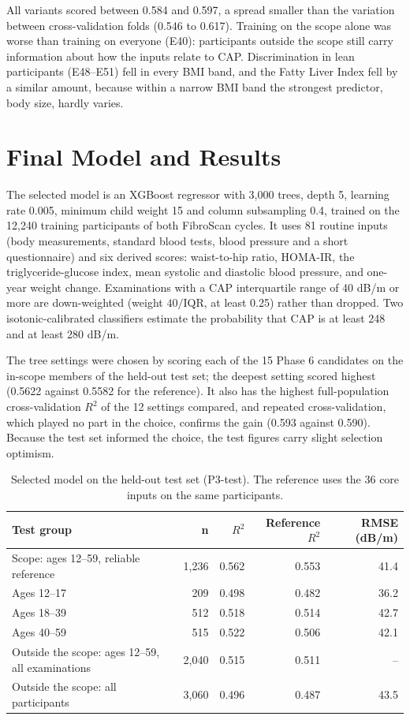 All variants scored between 0.584 and 0.597, a spread smaller than the
variation between cross-validation folds (0.546 to 0.617). Training on the
scope alone was worse than training on everyone (E40): participants outside
the scope still carry information about how the inputs relate to CAP.
Discrimination in lean participants (E48--E51) fell in every BMI band, and the
Fatty Liver Index fell by a similar amount, because within a narrow BMI band
the strongest predictor, body size, hardly varies.

\section{Final Model and Results}
\label{sec:exp_final}

The selected model is an XGBoost regressor \cite{chen2016xgboost} with 3,000
trees, depth 5, learning rate 0.005, minimum child weight 15 and column
subsampling 0.4, trained on the 12,240 training participants of both
FibroScan cycles. It uses 81 routine inputs (body measurements, standard blood
tests, blood pressure and a short questionnaire) and six derived scores:
waist-to-hip ratio, HOMA-IR, the triglyceride-glucose index, mean systolic and
diastolic blood pressure, and one-year weight change. Examinations with a CAP
interquartile range of 40 dB/m or more are down-weighted (weight $40/\mathrm{IQR}$,
at least 0.25) rather than dropped. Two isotonic-calibrated classifiers
estimate the probability that CAP is at least 248 and at least 280 dB/m.

The tree settings were chosen by scoring each of the 15 Phase 6 candidates on
the in-scope members of the held-out test set; the deepest setting scored
highest (0.5622 against 0.5582 for the reference). It also has the highest
full-population cross-validation $R^2$ of the 12 settings compared, and
repeated cross-validation, which played no part in the choice, confirms the
gain (0.593 against 0.590). Because the test set informed the choice, the
test figures carry slight selection optimism.

\begin{table}[htbp]
\centering
\caption{Selected model on the held-out test set (P3-test). The reference uses the 36 core inputs on the same participants.}
\label{tab:exp_final}
\begin{tabular}{p{6.4cm}rrrr}
\toprule
Test group & n & $R^2$ & Reference $R^2$ & RMSE (dB/m) \\
\midrule
Scope: ages 12--59, reliable reference & 1,236 & 0.562 & 0.553 & 41.4 \\
\quad Ages 12--17 & 209 & 0.498 & 0.482 & 36.2 \\
\quad Ages 18--39 & 512 & 0.518 & 0.514 & 42.7 \\
\quad Ages 40--59 & 515 & 0.522 & 0.506 & 42.1 \\
\midrule
Outside the scope: ages 12--59, all examinations & 2,040 & 0.515 & 0.511 & -- \\
Outside the scope: all participants & 3,060 & 0.496 & 0.487 & 43.5 \\
\bottomrule
\end{tabular}
\end{table}

